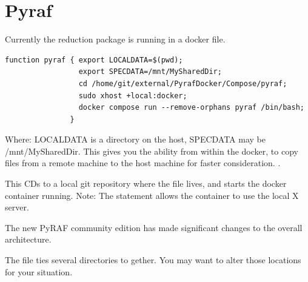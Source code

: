  \section{Pyraf}

Currently the reduction package is running in a docker file.

\begin{tcolorbox}[colframe=red!75!white,colupper=black,title=Pyraf alias entry for bash]
\begin{verbatim}
function pyraf { export LOCALDATA=$(pwd);
                 export SPECDATA=/mnt/MySharedDir;
                 cd /home/git/external/PyrafDocker/Compose/pyraf;
                 sudo xhost +local:docker;
                 docker compose run --remove-orphans pyraf /bin/bash;
               }
\end{verbatim}
\end{tcolorbox}

Where: LOCALDATA is a directory on the host, SPECDATA may be /mnt/MySharedDir.
This gives you the ability from within the docker, to copy files from
a remote machine to the host machine for faster consideration.
.

This CDs to a local git repository where the  file lives,
and starts the docker container running. Note: The 
statement allows the container to use the local X server.


The new PyRAF community edition has made significant changes to the
overall architecture.

The  file ties several directories to gether.
You may want to alter those locations for your situation.







